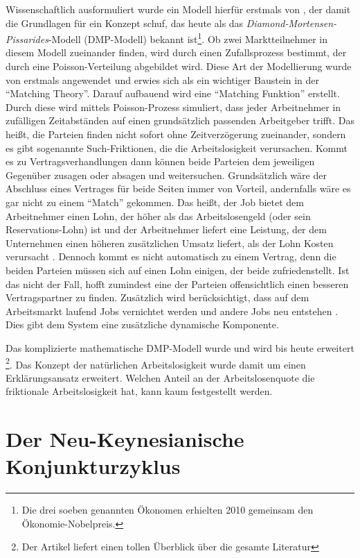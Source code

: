Wissenschaftlich ausformuliert wurde ein Modell hierfür erstmals von \textcite{Diamond1982}, der damit die Grundlagen für ein Konzept schuf, das heute als das \textit{Diamond-Mortensen-Pissarides}-Modell (DMP-Modell) bekannt ist\footnote{Die drei soeben genannten Ökonomen erhielten 2010 gemeinsam den Ökonomie-Nobelpreis.}. Ob zwei Marktteilnehmer in diesem Modell zueinander finden, wird durch einen Zufallsprozess bestimmt, der durch eine Poisson-Verteilung abgebildet wird. Diese Art der Modellierung wurde von \textcite{Mortensen1978} erstmals angewendet und erwies sich als ein wichtiger Baustein in der "`Matching Theory"'. Darauf aufbauend wird eine "`Matching Funktion"' erstellt. Durch diese wird mittels Poisson-Prozess simuliert, dass jeder Arbeitnehmer in zufälligen Zeitabständen auf einen grundsätzlich passenden Arbeitgeber trifft. Das heißt, die Parteien finden nicht sofort ohne Zeitverzögerung zueinander, sondern es gibt sogenannte Such-Friktionen, die die Arbeitslosigkeit verursachen. Kommt es zu Vertragsverhandlungen dann können beide Parteien dem jeweiligen Gegenüber zusagen oder absagen und weitersuchen. Grundsätzlich wäre der Abschluss eines Vertrages für beide Seiten immer von Vorteil, andernfalls wäre es gar nicht zu einem "`Match"' gekommen. Das heißt, der Job bietet dem Arbeitnehmer einen Lohn, der höher als das Arbeitslosengeld (oder sein Reservations-Lohn) ist und der Arbeitnehmer liefert eine Leistung, der dem Unternehmen einen höheren zusätzlichen Umsatz liefert, als der Lohn Kosten verursacht \parencite{Pissarides1985}. Dennoch kommt es nicht automatisch zu einem Vertrag, denn die beiden Parteien müssen sich auf einen Lohn einigen, der beide zufriedenstellt. Ist das nicht der Fall, hofft zumindest eine der Parteien offensichtlich einen besseren Vertragspartner zu finden. Zusätzlich wird berücksichtigt, dass auf dem Arbeitsmarkt laufend Jobs vernichtet werden und andere Jobs neu entstehen \parencite{Mortensen_Pissarides1994}. Dies gibt dem System eine zusätzliche dynamische Komponente. 

Das komplizierte mathematische DMP-Modell wurde und wird bis heute erweitert \parencite{Rogerson2005}\footnote{Der Artikel liefert einen tollen Überblick über die gesamte Literatur}. Das Konzept der natürlichen Arbeitslosigkeit wurde damit um einen Erklärungsansatz erweitert. Welchen Anteil an der Arbeitslosenquote die friktionale Arbeitslosigkeit hat, kann kaum festgestellt werden.


\section{Der Neu-Keynesianische Konjunkturzyklus}

